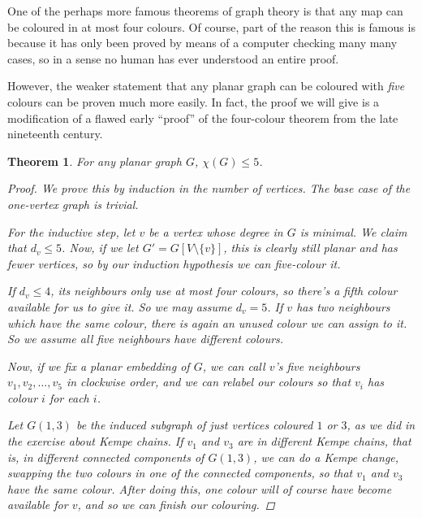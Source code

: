 \documentclass[nobib]{tufte-handout}
\newtheorem{theorem}{Theorem}
\begin{document}
One of the perhaps more famous theorems of graph theory is that any map can be coloured in at most four colours. Of course, part of the reason this is famous is because it has only been proved by means of a computer checking many many cases, so in a sense no human has ever understood an entire proof.

However, the weaker statement that any planar graph can be coloured with \emph{five} colours can be proven much more easily. In fact, the proof we will give is a modification of a flawed early ``proof'' of the four-colour theorem from the late nineteenth century.

\begin{theorem}
  For any planar graph $G$, $\chi(G) \leq 5$.

  \begin{proof}
    We prove this by induction in the number of vertices. The base case of the one-vertex graph is trivial.

    For the inductive step, let $v$ be a vertex whose degree in $G$ is minimal. We claim that $d_v \leq 5$. Now, if we let $G' = G[V \setminus \{v\}]$, this is clearly still planar and has fewer vertices, so by our induction hypothesis we can five-colour it.

    If $d_v \leq 4$, its neighbours only use at most four colours, so there's a fifth colour available for us to give it. So we may assume $d_v = 5$. If $v$ has two neighbours which have the same colour, there is again an unused colour we can assign to it. So we assume all five neighbours have different colours.

    Now, if we fix a planar embedding of $G$, we can call $v$'s five neighbours $v_1, v_2, \ldots, v_5$ in clockwise order, and we can relabel our colours so that $v_i$ has colour $i$ for each $i$.

    Let $G(1,3)$ be the induced subgraph of just vertices coloured $1$ or $3$, as we did in the exercise about Kempe chains. If $v_1$ and $v_3$ are in different Kempe chains, that is, in different connected components of $G(1,3)$, we can do a Kempe change, swapping the two colours in one of the connected components, so that $v_1$ and $v_3$ have the same colour. After doing this, one colour will of course have become available for $v$, and so we can finish our colouring.


\end{proof}
\end{theorem}
\end{document}
